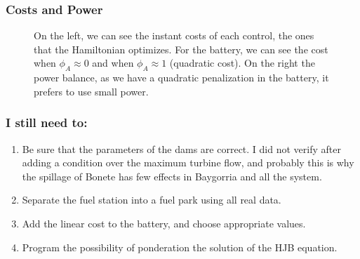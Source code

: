 \documentclass[aspectratio=169]{beamer}\usepackage[utf8]{inputenc}
\begin{document}
\begin{frame}\frametitle{Costs and Power}
\begin{figure}[ht!]
\centering
{}
\caption{On the left, we can see the instant costs of each control, the ones that the Hamiltonian optimizes. For the battery, we can see the cost when $\phi_A\approx0$ and when $\phi_A\approx1$ (quadratic cost). On the right the power balance, as we have a quadratic penalization in the battery, it prefers to use small power.}
\end{figure}
\end{frame}

\begin{frame}
\begin{figure}[ht!]
\centering
{}
\end{figure}
\end{frame}

\begin{frame}
\begin{figure}[ht!]
\centering
{}
\end{figure}
\end{frame}

\begin{frame}\frametitle{I still need to:}
\begin{enumerate}

\item Be sure that the parameters of the dams are correct. I did not verify after adding a condition over the maximum turbine flow, and probably this is why the spillage of Bonete has few effects in Baygorria and all the system.

\item Separate the fuel station into a fuel park using all real data.

\item Add the linear cost to the battery, and choose appropriate values.

\item Program the possibility of ponderation the solution of the HJB equation.

\end{enumerate}
\end{frame}
\end{document}
